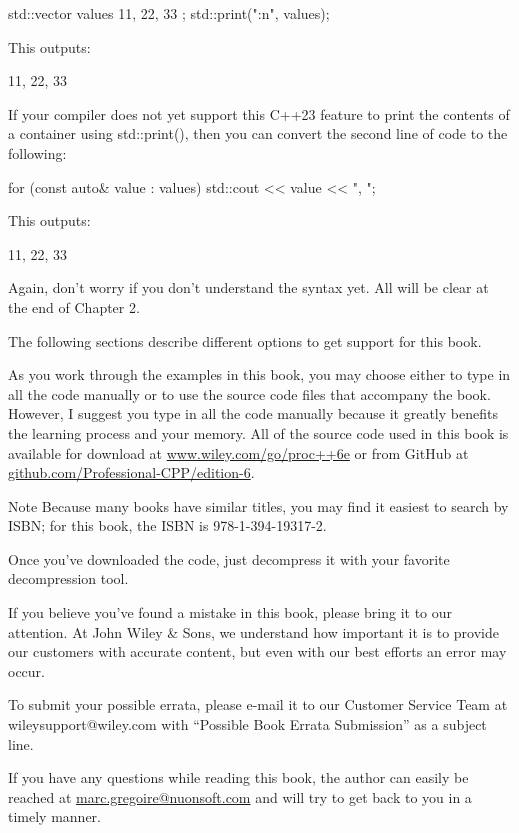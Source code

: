 \begin{cpp}
std::vector values { 11, 22, 33 };
std::print("{:n}", values);
\end{cpp}

This outputs:

\begin{shell}
11, 22, 33
\end{shell}

If your compiler does not yet support this C++23 feature to print the contents of a container using std::print(), then you can convert the second line of code to the following:

\begin{cpp}
for (const auto& value : values) { std::cout << value << ", "; }
\end{cpp}

This outputs:

\begin{shell}
11, 22, 33
\end{shell}

Again, don’t worry if you don’t understand the syntax yet. All will be clear at the end of Chapter 2.


The following sections describe different options to get support for this book.


As you work through the examples in this book, you may choose either to type in all the code manually or to use the source code files that accompany the book. However, I suggest you type in all the code manually because it greatly benefits the learning process and your memory. All of the source code used in this book is available for download at \url{www.wiley.com/go/proc++6e} or from GitHub at \url{github.com/Professional-CPP/edition-6}.

\begin{myNotic}{Note}
Because many books have similar titles, you may find it easiest to search by ISBN; for this book, the ISBN is 978-1-394-19317-2.
\end{myNotic}

Once you’ve downloaded the code, just decompress it with your favorite decompression tool.


If you believe you’ve found a mistake in this book, please bring it to our attention. At John Wiley \& Sons, we understand how important it is to provide our customers with accurate content, but even with our best efforts an error may occur.

To submit your possible errata, please e-mail it to our Customer Service Team at wileysupport@wiley.com with “Possible Book Errata Submission” as a subject line.


If you have any questions while reading this book, the author can easily be reached at \url{marc.gregoire@nuonsoft.com} and will try to get back to you in a timely manner.